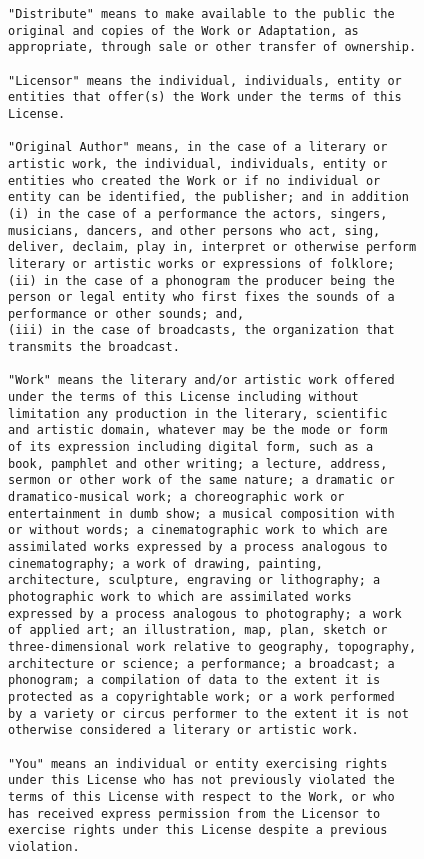 \begin{verbatim}
"Distribute" means to make available to the public the
original and copies of the Work or Adaptation, as
appropriate, through sale or other transfer of ownership.

"Licensor" means the individual, individuals, entity or
entities that offer(s) the Work under the terms of this
License.

"Original Author" means, in the case of a literary or
artistic work, the individual, individuals, entity or
entities who created the Work or if no individual or
entity can be identified, the publisher; and in addition
(i) in the case of a performance the actors, singers,
musicians, dancers, and other persons who act, sing,
deliver, declaim, play in, interpret or otherwise perform
literary or artistic works or expressions of folklore;
(ii) in the case of a phonogram the producer being the
person or legal entity who first fixes the sounds of a
performance or other sounds; and,
(iii) in the case of broadcasts, the organization that
transmits the broadcast.

"Work" means the literary and/or artistic work offered
under the terms of this License including without
limitation any production in the literary, scientific
and artistic domain, whatever may be the mode or form
of its expression including digital form, such as a
book, pamphlet and other writing; a lecture, address,
sermon or other work of the same nature; a dramatic or
dramatico-musical work; a choreographic work or
entertainment in dumb show; a musical composition with
or without words; a cinematographic work to which are
assimilated works expressed by a process analogous to
cinematography; a work of drawing, painting,
architecture, sculpture, engraving or lithography; a
photographic work to which are assimilated works
expressed by a process analogous to photography; a work
of applied art; an illustration, map, plan, sketch or
three-dimensional work relative to geography, topography,
architecture or science; a performance; a broadcast; a
phonogram; a compilation of data to the extent it is
protected as a copyrightable work; or a work performed
by a variety or circus performer to the extent it is not
otherwise considered a literary or artistic work.

"You" means an individual or entity exercising rights
under this License who has not previously violated the
terms of this License with respect to the Work, or who
has received express permission from the Licensor to
exercise rights under this License despite a previous
violation.


\end{verbatim}
